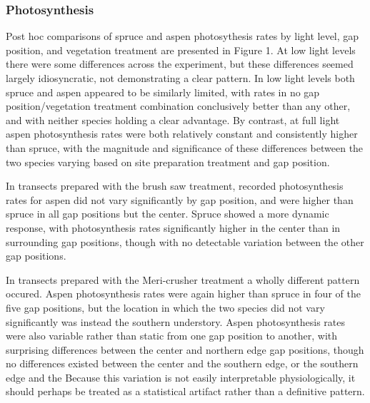 \documentclass{article}\usepackage[]{graphicx}\usepackage[]{color}
\begin{document}
\begin{multicols}{2}

\subsubsection{Photosynthesis}

Post hoc comparisons of spruce and aspen photosythesis rates by light level, gap position, and vegetation treatment are presented in Figure 1. At low light levels there were some differences across the experiment, but these differences seemed largely idiosyncratic, not demonstrating a clear pattern. In low light levels both spruce and aspen appeared to be similarly limited, with rates in no gap position/vegetation treatment combination conclusively better than any other, and with neither species holding a clear advantage. By contrast, at full light aspen photosynthesis rates were both relatively constant and consistently higher than spruce, with the magnitude and significance of these differences between the two species varying based on site preparation treatment and gap position. 

In transects prepared with the brush saw treatment, recorded photosynthesis rates for aspen did not vary significantly by gap position, and were higher than spruce in all gap positions but the center. Spruce showed a more dynamic response, with photosynthesis rates significantly higher in the center than in surrounding gap positions, though with no detectable variation between the other gap positions. 

In transects prepared with the Meri-crusher treatment a wholly different pattern occured. Aspen photosynthesis rates were again higher than spruce in four of the five gap positions, but the location in which the two species did not vary significantly was instead the southern understory. Aspen photosynthesis rates were also variable rather than static from one gap position to another, with surprising differences between the center and northern edge gap positions, though no differences existed between the center and the southern edge, or the southern edge and the Because this variation is not easily interpretable physiologically, it should perhaps be treated as a statistical artifact rather than a definitive pattern.

\end{multicols}
\end{document}
